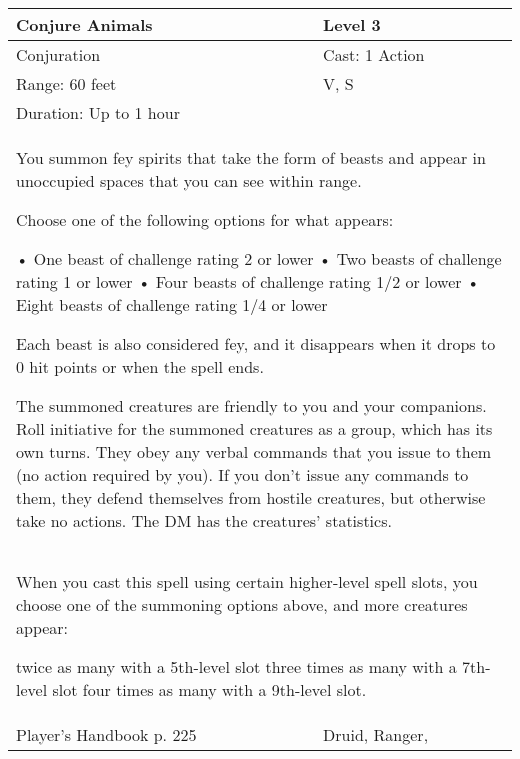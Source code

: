 \documentclass[11pt]{report}
\begin{document}
\begin{table}[H]
	\begin{tabular}{||p{6cm}|p{6cm}||}
		\hline\hline
		\bf{Conjure Animals} & Level 3\\ \hline
		Conjuration & Cast: 1 Action\\ \hline
		Range: 60 feet & V, S\\ \hline
		Duration: Up to 1 hour & \\ \hline
		\multicolumn{2}{||p{12cm}||}{You summon fey spirits that take the form of beasts and appear in unoccupied spaces that you can see within range. 

Choose one of the following options for what appears: 

•  One beast of challenge rating 2 or lower 
•  Two beasts of challenge rating 1  or lower 
•  Four beasts of challenge rating 1/2 or lower 
•  Eight beasts of challenge rating 1/4 or lower 

Each beast is also considered fey, and it disappears when it drops to 0 hit points or when the spell ends. 

The summoned creatures are friendly to you and your companions. Roll initiative for the summoned creatures as a group, which has its own turns. They obey any verbal commands that you issue to them (no action required by you). If you don’t issue any commands to them, they defend themselves from hostile creatures, but otherwise take no actions. 
The DM has the creatures’ statistics.}\\ \hline
		\multicolumn{2}{||p{12cm}||}{When you cast this spell using certain higher-level spell slots, you choose one of the summoning options above, and more creatures appear: 

twice as many with a 5th-level slot
three times as many with a 7th-level slot 
four times as many with a 9th-level slot.}\\ \hline
Player's Handbook p. 225 & Druid, Ranger, \\ \hline\hline
	\end{tabular}
\end{table}
\end{document}
